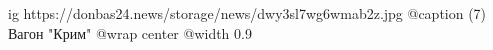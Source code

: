  
 
 
 
 

\ifcmt
  ig https://donbas24.news/storage/news/dwy3sl7wg6wmab2z.jpg
	@caption (7) Вагон "Крим"
  @wrap center
  @width 0.9
\fi
